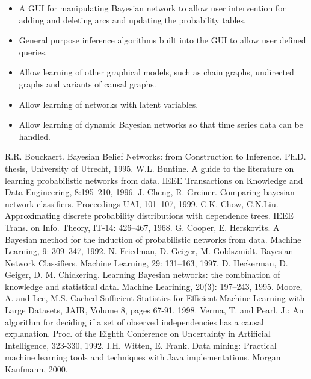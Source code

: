 \documentclass{article}
\begin{document}
\begin{itemize}
\item A GUI for manipulating Bayesian network to allow user intervention for
adding and deleting arcs and updating the probability tables.

\item General purpose inference algorithms built into the GUI to allow user
defined queries.

\item Allow learning of other graphical models, such as chain graphs,
undirected graphs and variants of causal graphs.

\item Allow learning of networks with latent variables.

\item Allow learning of dynamic Bayesian networks so that time series data
can be handled.
\end{itemize}



\begin{thebibliography}{1}
	R.R. Bouckaert. Bayesian Belief Networks: from Construction to Inference. 
	Ph.D. thesis, 
	University of Utrecht, 
	1995.
        W.L. Buntine. A guide to the literature on learning probabilistic networks from data. 
	IEEE Transactions on Knowledge and Data Engineering, 8:195--210, 
	1996. 
	J. Cheng, R. Greiner. 
	Comparing bayesian network classifiers. 
	Proceedings UAI,
	101--107,
	1999.
	C.K. Chow, C.N.Liu.
	Approximating discrete probability distributions with dependence trees.
	IEEE Trans. on Info. Theory, IT-14: 426--467, 1968.
	G. Cooper, E. Herskovits. 
	A Bayesian method for the induction of probabilistic networks from data. 
	Machine Learning, 9: 309--347, 1992.
	N. Friedman, D. Geiger, M. Goldszmidt. 
	Bayesian Network Classifiers. 
	Machine Learning, 29: 131--163, 1997.
	D. Heckerman, D. Geiger, D. M. Chickering. 
	Learning Bayesian networks: the combination of knowledge and statistical data. 
	Machine Learining, 20(3): 197--243, 1995.
  Moore, A. and Lee, M.S. Cached Sufficient Statistics for Efficient Machine Learning with Large Datasets,
  JAIR, 
  Volume 8, pages 67-91, 1998. 
  Verma, T. and Pearl, J.: 
  An algorithm for deciding if a set of observed independencies has a causal explanation. 
  Proc. of the Eighth Conference on Uncertainty in Artificial Intelligence, 
  323-330, 
1992.
	I.H. Witten, E. Frank. 
	Data mining: Practical machine learning tools and techniques with Java implementations. 
	Morgan Kaufmann, 
	2000.
\end{thebibliography}
\end{document}
